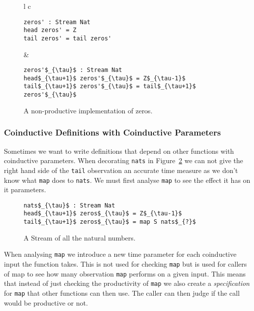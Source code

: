 \begin{figure}
\begin{tabular}{l c}
\begin{minipage}{3in}
\begin{Verbatim}[commandchars=\\\{\},codes={\catcode`$=3\catcode`_=8}]
zeros' : Stream Nat
head zeros' = Z
tail zeros' = tail zeros'
\end{Verbatim}
\end{minipage} &
\begin{minipage}{3in}
\begin{Verbatim}[commandchars=\\\{\},codes={\catcode`$=3\catcode`_=8}]
zeros'$_{\tau}$ : Stream Nat
head$_{\tau+1}$ zeros'$_{\tau}$ = Z$_{\tau-1}$
tail$_{\tau+1}$ zeros'$_{\tau}$ = tail$_{\tau+1}$ zeros'$_{\tau}$
\end{Verbatim}
\end{minipage}
\end{tabular}
\caption{A non-productive implementation of zeros.}
\label{fig:zerosprime}
\end{figure}

\subsubsection{Coinductive Definitions with Coinductive Parameters}

Sometimes we want to write definitions that depend on other functions with coinductive parameters. When decorating \texttt{nats} in Figure~\ref{fig:nats} we can not give the right hand side of the \texttt{tail} observation an accurate time measure as we don't know what \texttt{map} does to \texttt{nats}. We must first analyse \texttt{map} to see the effect it has on it parameters.

\begin{figure}
\begin{Verbatim}[commandchars=\\\{\},codes={\catcode`$=3\catcode`_=8}]
nats$_{\tau}$ : Stream Nat
head$_{\tau+1}$ zeros$_{\tau}$ = Z$_{\tau-1}$
tail$_{\tau+1}$ zeros$_{\tau}$ = map S nats$_{?}$
\end{Verbatim}
\caption{A Stream of all the natural numbers.}
\label{fig:nats}
\end{figure}

When analysing \texttt{map} we introduce a new time parameter for each coinductive input the function takes. This is not used for checking \texttt{map} but is used for callers of map to see how many observation \texttt{map} performs on a given input. This means that instead of just checking the productivity of \texttt{map} we also create a \textit{specification} for \texttt{map} that other functions can then use. The caller can then judge if the call would be productive or not.

